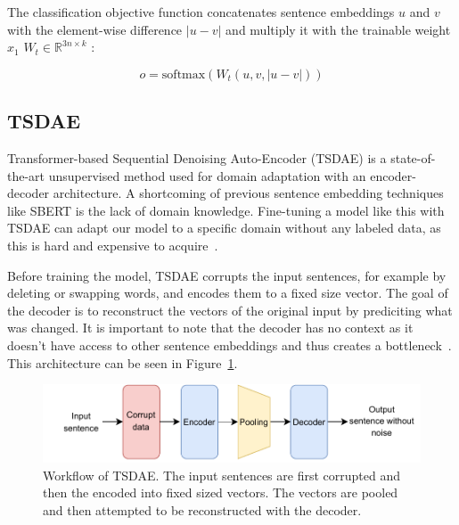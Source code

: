 \documentclass[fleqn,moreauthors,10pt]{ds_report}
\begin{document}
The classification objective function concatenates sentence embeddings \(u\) and \(v\) with the element-wise difference \(|u - v|\) and multiply it with the trainable weight \(x_1\) \( W_t \in \mathbb{R}^{3n \times k} \) \cite{SBERT}:

\begin{equation}
o = \text{softmax}(W_t(u, v, |u - v|))
\label{eq:softmax}
\end{equation}

\subsection*{TSDAE}

Transformer-based Sequential Denoising Auto-Encoder (TSDAE) is a state-of-the-art unsupervised method used for domain adaptation with an encoder-decoder architecture. A shortcoming of previous sentence embedding techniques like SBERT is the lack of domain knowledge. Fine-tuning a model like this with TSDAE can adapt our model to a specific domain without any labeled data, as this is hard and expensive to acquire~\cite{wang-etal-2021-tsdae-using}. 

Before training the model, TSDAE corrupts the input sentences, for example by deleting or swapping words, and encodes them to a fixed size vector. The goal of the decoder is to reconstruct the vectors of the original input by prediciting what was changed. It is important to note that the decoder has no context as it doesn't have access to other sentence embeddings and thus creates a bottleneck~\cite{wang-etal-2021-tsdae-using}. This architecture can be seen in Figure~\ref{fig:tsdae}.

\begin{figure}[ht]\centering
	\vspace{12 pt}
	\includegraphics[width=\linewidth]{TSDAE_scheme.pdf}
	\vspace{5 pt}
	\caption{Workflow of TSDAE. The input sentences are first corrupted and then the encoded into fixed sized vectors. The vectors are pooled and then attempted to be reconstructed with the decoder.}
	\label{fig:tsdae}
\end{figure}
\end{document}
